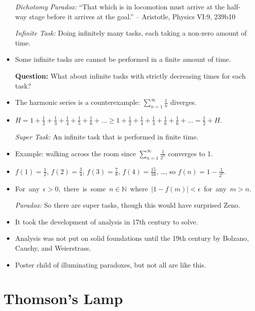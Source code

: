 \documentclass[a4paper, 11pt]{article} %
\newcommand{\abs}[1]{|#1|} %
\newcommand{\N}{\mathbb{N}}
\begin{document}
\begin{itemize}
  \item[\it Dichotomy Paradox:] ``That which is in locomotion must arrive at the half-way stage before it arrives at the goal.'' -- Aristotle, Physics VI:9, 239b10
  \item[\it Infinite Task:] Doing infinitely many tasks, each taking a non-zero amount of time.
    \item Some infinite tasks are cannot be performed in a finite amount of time.
  \item[\bf Question:] What about infinite tasks with strictly decreasing times for each task?
    \item The harmonic series is a counterexample: $\sum_{n=1}^\infty \frac{1}{n}$ diverges.
    \item $H = 1 + \frac{1}{2} + \frac{1}{3} + \frac{1}{4} + \frac{1}{5} + \frac{1}{6} + \ldots \geq 1 + \frac{1}{2} + \frac{1}{4} + \frac{1}{4} + \frac{1}{6} + \frac{1}{6} + \ldots = \frac{1}{2} + H$.
  \item[\it Super Task:] An infinite task that is performed in finite time. 
    \item Example: walking across the room since $\sum_{n=1}^\infty \frac{1}{2^n}$ converges to 1.
    \item $f(1)=\frac{1}{2}$, $f(2)=\frac{3}{4}$, $f(3)=\frac{7}{8}$, $f(4)=\frac{15}{16}$, \ldots, so $f(n)=1-\frac{1}{2^n}$.
    \item \mbox{For any $\epsilon > 0$, there is some $n \in \N$ where $\abs{1-f(m)} < \epsilon$ for any $m > n$.}
  \item[\it Paradox:] So there are super tasks, though this would have surprised Zeno.
    \item It took the development of analysis in 17th century to solve.
    \item Analysis was not put on solid foundations until the 19th century by Bolzano, Cauchy, and Weierstrass.
    \item Poster child of illuminating paradoxes, but not all are like this.
\end{itemize}




\section*{Thomson's Lamp}
\end{document}
